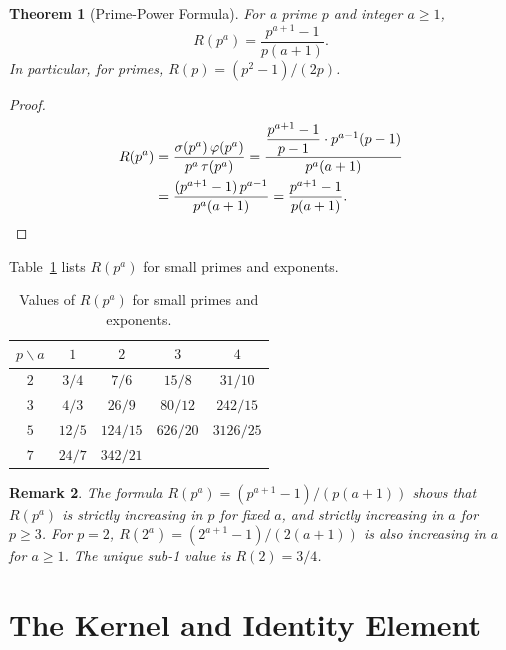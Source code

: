 \documentclass[12pt]{article}
\newtheorem{theorem}{Theorem}[section]
\newtheorem{remark}[theorem]{Remark}
\begin{document}
\begin{theorem}[Prime-Power Formula]\label{thm:primepower}
For a prime $p$ and integer $a\ge 1$,
\[
  R(p^a) = \frac{p^{a+1}-1}{p(a+1)}.
\]
In particular, for primes, $R(p) = (p^2-1)/(2p)$.
\end{theorem}

\begin{proof}
\begin{align*}
  R(p^a) &= \frac{\sigma(p^a)\,\varphi(p^a)}{p^a\,\tau(p^a)}
           = \frac{\dfrac{p^{a+1}-1}{p-1}\cdot p^{a-1}(p-1)}{p^a(a+1)} \\
          &= \frac{(p^{a+1}-1)\,p^{a-1}}{p^a(a+1)}
           = \frac{p^{a+1}-1}{p(a+1)}. \qedhere
\end{align*}
\end{proof}

\noindent Table~\ref{tab:primepowers} lists $R(p^a)$ for small primes and exponents.

\begin{table}[h]
\centering
\caption{Values of $R(p^a)$ for small primes and exponents.}
\label{tab:primepowers}
\begin{tabular}{c|cccc}
\toprule
$p \backslash a$ & $1$ & $2$ & $3$ & $4$ \\
\midrule
$2$ & $3/4$ & $7/6$ & $15/8$ & $31/10$ \\
$3$ & $4/3$ & $26/9$ & $80/12$ & $242/15$ \\
$5$ & $12/5$ & $124/15$ & $626/20$ & $3126/25$ \\
$7$ & $24/7$ & $342/21$ & & \\
\bottomrule
\end{tabular}
\end{table}

\begin{remark}
The formula $R(p^a)=(p^{a+1}-1)/(p(a+1))$ shows that $R(p^a)$ is strictly
increasing in $p$ for fixed $a$, and strictly increasing in $a$ for $p\ge 3$.
For $p=2$, $R(2^a)=(2^{a+1}-1)/(2(a+1))$ is also increasing in $a$ for $a\ge 1$.
The unique sub-1 value is $R(2)=3/4$.
\end{remark}

\section{The Kernel and Identity Element}
\label{sec:kernel}
\end{document}
